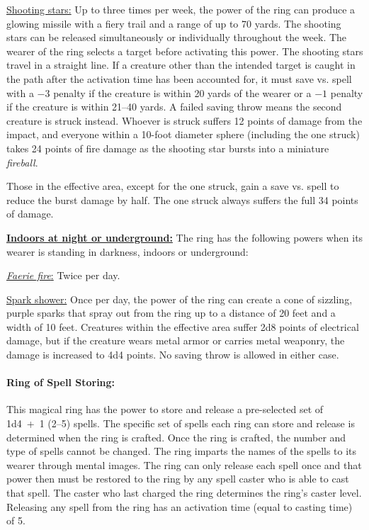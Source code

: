 \begin{multicols}{2}
\underline{Shooting stars:} Up to three times per week, the power of the ring can produce a glowing missile with a fiery trail and a range of up to 70 yards.  The shooting stars can be released simultaneously or individually throughout the week.  The wearer of the ring selects a target before activating this power.  The shooting stars travel in a straight line.  If a creature other than the intended target is caught in the path after the activation time has been accounted for, it must save vs. spell with a $-3$ penalty if the creature is within 20 yards of the wearer or a $-1$ penalty if the creature is within 21--40 yards.  A failed saving throw means the second creature is struck instead.  Whoever is struck suffers 12 points of damage from the impact, and everyone within a 10-foot diameter sphere (including the one struck) takes 24 points of fire damage as the shooting star bursts into a miniature \textit{fireball}.  

Those in the effective area, except for the one struck, gain a save vs. spell to reduce the burst damage by half.  The one struck always suffers the full 34 points of damage.
 
\textbf{\underline{Indoors at night or underground:}} The ring has the following powers when its wearer is standing in darkness, indoors or underground:

\underline{\textit{Faerie fire}:} Twice per day.

\underline{Spark shower:} Once per day, the power of the ring can create a cone of sizzling, purple sparks that spray out from the ring up to a distance of 20 feet and a width of 10 feet.  Creatures within the effective area suffer 2d8 points of electrical damage, but if the creature wears metal armor or carries metal weaponry, the damage is increased to 4d4 points.  No saving throw is allowed in either case.

\paragraph{Ring of Spell Storing:} This magical ring has the power to store and release a pre-selected set of 1d4~+~1 (2--5) spells.  The specific set of spells each ring can store and release is determined when the ring is crafted.  Once the ring is crafted, the number and type of spells cannot be changed.   The ring imparts the names of the spells to its wearer through mental images.  The ring can only release each spell once and that power then must be restored to the ring by any spell caster who is able to cast that spell.  The caster who last charged the ring determines the ring's caster level.  Releasing any spell from the ring has an activation time (equal to casting time) of 5.


\end{multicols}
